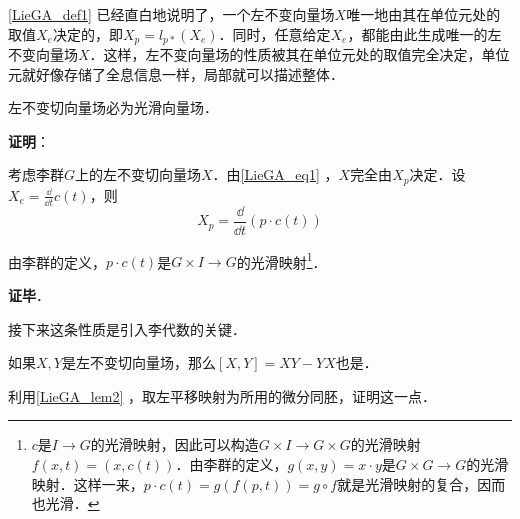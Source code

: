 \autoref{LieGA_def1} 已经直白地说明了，一个左不变向量场$X$唯一地由其在单位元处的取值$X_e$决定的，即$X_p=l_{p*}(X_e)$．同时，任意给定$X_e$，都能由此生成唯一的左不变向量场$X$．这样，左不变向量场的性质被其在单位元处的取值完全决定，单位元就好像存储了全息信息一样，局部就可以描述整体．

\begin{theorem}{}
左不变切向量场必为光滑向量场．
\end{theorem}

\textbf{证明}：


考虑李群$G$上的左不变切向量场$X$．由\autoref{LieGA_eq1} ，$X$完全由$X_p$决定．设$X_e=\frac{\dd }{\dd t}c(t)$，则
\begin{equation}
X_p=\frac{\dd}{\dd t}(p\cdot c(t))
\end{equation}

由李群的定义，$p\cdot c(t)$是$G\times I\to G$的光滑映射\footnote{$c$是$I\to G$的光滑映射，因此可以构造$G\times I\to G\times G$的光滑映射$f(x, t)=(x, c(t))$．由李群的定义，$g(x, y)=x\cdot y$是$G\times G\to G$的光滑映射．这样一来，$p\cdot c(t)=g(f(p, t))=g\circ f$就是光滑映射的复合，因而也光滑．}．









\textbf{证毕}．

接下来这条性质是引入李代数的关键．

\begin{exercise}{}
如果$X, Y$是左不变切向量场，那么$[X, Y]=XY-YX$也是．

利用\autoref{LieGA_lem2} ，取左平移映射为所用的微分同胚，证明这一点．
\end{exercise}


